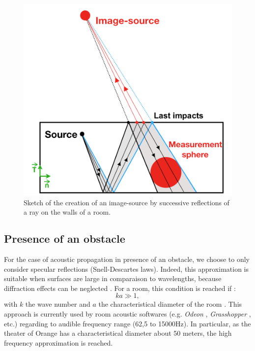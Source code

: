 \documentclass[AMA,STIX1COL]{WileyNJD-v2}
\begin{document}
%
\begin{figure}[t]
	\centering
	\includegraphics[width=0.5\linewidth]{schema_SI}
	\caption{Sketch of the creation of an image-source by successive reflections of a ray on the walls of a room.}
	\label{schema_SI}
\end{figure}



\subsection{Presence of an obstacle}
For the case of acoustic propagation in presence of an obstacle, we choose to only consider specular reflections (Snell-Descartes laws). Indeed, this approximation is suitable when surfaces are large in comparaison to wavelengths, because diffraction effects can be neglected \cite{jouhaneau}. For a room, this condition is reached if :
\begin{equation}
ka \gg 1, 
\end{equation}
with $k$ the wave number and $a$ the characteristical diameter of the room \cite{hautes_freq}. This approach is currently used by room acoustic softwares (e.g. \textit{Odeon} \cite{odeon}, \textit{Grasshopper} \cite{grasshopper}, etc.) regarding to audible frequency range (62,5 to 15000Hz). In particular, as the theater of Orange has a characteristical diameter about 50 meters, the high frequency approximation is reached. 
\end{document}
